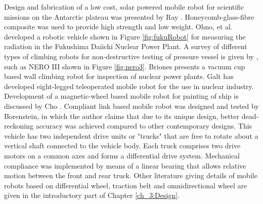 Design and fabrication of a low cost, solar powered mobile robot for  scientific missions on the Antarctic plateau was presented by Ray  \cite{ray2005design}. Honeycomb-glass-fibre composite was used to provide high strength and low weight. Ohno, et al. \cite{ohno2011robotic}   developed a robotic  vehicle shown in Figure \ref{fig:fukuRobot} for measuring the radiation in the Fukushima Daiichi Nuclear Power Plant. A survey of different types of climbing robots for non-destructive testing of pressure vessel is given by \cite{luk2006tele}, such as NERO III shown in Figure \ref{fig:nero3}.  Briones \cite{briones1994wall} presents a vacuum cup based wall climbing robot for inspection of  nuclear power plants. Galt \cite{galt1997tele} has developed eight-legged teleoperated mobile robot for the use in nuclear industry. Development of a magnetic-wheel based mobile robot for painting of ship is discussed by Cho \cite{cho2013study}. Compliant link based mobile robot was designed and tested by Borenstein\cite{borenstein1995control}, in which the author claims that due to its unique design, better dead-reckoning accuracy was achieved compared to other contemporary designs. This vehicle has two independent drive units or "trucks" that are free to rotate about a vertical shaft connected to the vehicle body. Each truck comprises two drive motors on a common axes and forms a differential drive system. Mechanical compliance was implemented by means of a linear bearing that allows relative motion between the front and rear truck. Other literature giving details of  mobile robots based on   differential wheel, traction belt and omnidirectional wheel are given in the introductory part of Chapter \ref{ch_3:Design}.
